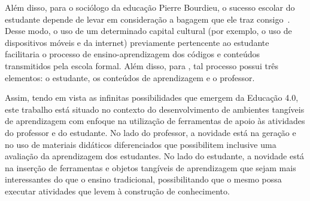 Além disso, para o sociólogo da educação Pierre Bourdieu, o sucesso  escolar do estudante depende de levar em consideração a bagagem que ele traz consigo~\citep{Nogueira:2013}. Desse modo, o uso de um determinado capital cultural (por exemplo, o uso de dispositivos móveis e da internet) previamente pertencente ao estudante facilitaria o processo de ensino-aprendizagem dos códigos e conteúdos transmitidos pela escola formal. Além disso, para \cite{bassedas:1996}, tal processo possui três elementos: o estudante, os conteúdos de aprendizagem e o professor.



Assim, tendo em vista as infinitas possibilidades que emergem da Educação 4.0, este trabalho está situado no contexto do desenvolvimento de ambientes tangíveis de aprendizagem com enfoque na utilização de ferramentas de apoio às atividades do professor e do estudante. No lado do professor, a novidade está na geração e no uso de materiais didáticos diferenciados que possibilitem inclusive uma avaliação da aprendizagem dos estudantes. No lado do estudante, a novidade está na inserção de ferramentas e objetos tangíveis de aprendizagem que sejam mais interessantes do que o ensino tradicional, possibilitando que o mesmo possa executar atividades que levem à construção de conhecimento.

